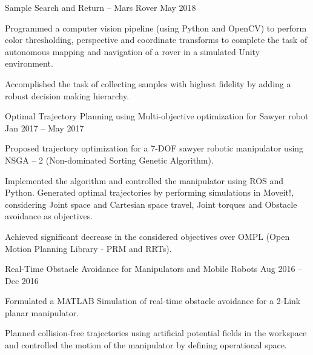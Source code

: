 

\begin{cventries}

  \cvprojectentry
    {Sample Search and Return – Mars Rover} %
    {May 2018} %
    {
      \begin{cvitems} %
        \item {Programmed a computer vision pipeline (using Python and OpenCV) to perform color thresholding, perspective and coordinate transforms to complete the task of autonomous mapping and navigation of a rover in a simulated Unity environment.}
        \item {Accomplished the task of collecting samples with highest fidelity by adding a robust decision making hierarchy.}
      \end{cvitems}
    }

  \cvprojectentry
    {Optimal Trajectory Planning using Multi-objective optimization for Sawyer robot} %
    {Jan 2017 – May 2017} %
    {
      \begin{cvitems} %
        \item {Proposed trajectory optimization for a 7-DOF sawyer robotic manipulator using NSGA – 2 (Non-dominated Sorting Genetic Algorithm).}
        \item {Implemented the algorithm and controlled the manipulator using ROS and Python. Generated optimal trajectories by performing simulations in Moveit!, considering Joint space and Cartesian space travel, Joint torques and Obstacle avoidance as objectives.}
        \item {Achieved significant decrease in the considered objectives over OMPL (Open Motion Planning Library - PRM and RRTs).}
      \end{cvitems}
    }

  \cvprojectentry
    {Real-Time Obstacle Avoidance for Manipulators and Mobile Robots} %
    {Aug 2016 – Dec 2016} %
    {
      \begin{cvitems} %
        \item {Formulated a MATLAB Simulation of real-time obstacle avoidance for a 2-Link planar manipulator.}
        \item {Planned collision-free trajectories using artificial potential fields in the workspace and controlled the motion of the manipulator by defining operational space.}
      \end{cvitems}
    }


\end{cventries}
